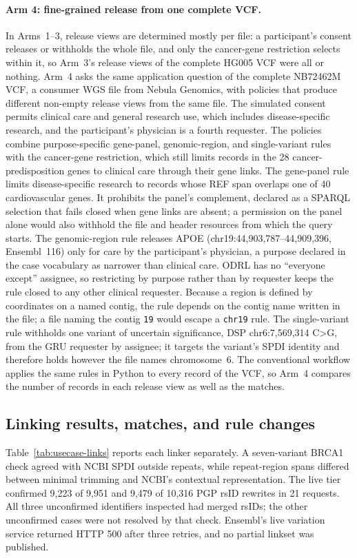 \documentclass[11pt]{article}
\begin{document}
\paragraph{Arm 4: fine-grained release from one complete VCF.}
In Arms~1--3, release views are determined mostly per file: a participant's consent releases or withholds the whole file, and only the cancer-gene restriction selects within it, so Arm~3's release views of the complete HG005 VCF were all or nothing.
Arm~4 asks the same application question of the complete NB72462M VCF, a consumer WGS file from Nebula Genomics, with policies that produce different non-empty release views from the same file.
The simulated consent permits clinical care and general research use, which includes disease-specific research, and the participant's physician is a fourth requester.
The policies combine purpose-specific gene-panel, genomic-region, and single-variant rules with the cancer-gene restriction, which still limits records in the 28 cancer-predisposition genes to clinical care through their gene links.
The gene-panel rule limits disease-specific research to records whose REF span overlaps one of 40 cardiovascular genes.
It prohibits the panel's complement, declared as a SPARQL selection that fails closed when gene links are absent; a permission on the panel alone would also withhold the file and header resources from which the query starts.
The genomic-region rule releases APOE (chr19:44,903,787--44,909,396, Ensembl~116) only for care by the participant's physician, a purpose declared in the case vocabulary as narrower than clinical care.
ODRL has no ``everyone except'' assignee, so restricting by purpose rather than by requester keeps the rule closed to any other clinical requester.
Because a region is defined by coordinates on a named contig, the rule depends on the contig name written in the file; a file naming the contig \texttt{19} would escape a \texttt{chr19} rule.
The single-variant rule withholds one variant of uncertain significance, DSP chr6:7,569,314 C>G, from the GRU requester by assignee; it targets the variant's SPDI identity and therefore holds however the file names chromosome~6.
The conventional workflow applies the same rules in Python to every record of the VCF, so Arm~4 compares the number of records in each release view as well as the matches.

\subsection{Linking results, matches, and rule changes}\label{subsec:usecase-results}
Table~\ref{tab:usecase-links} reports each linker separately.
A seven-variant BRCA1 check agreed with NCBI SPDI outside repeats, while repeat-region spans differed between minimal trimming and NCBI's contextual representation.
The live tier confirmed 9,223 of 9,951 and 9,479 of 10,316 PGP rsID rewrites in 21 requests.
All three unconfirmed identifiers inspected had merged rsIDs; the other unconfirmed cases were not resolved by that check.
Ensembl's live variation service returned HTTP 500 after three retries, and no partial linkset was published.
\end{document}
